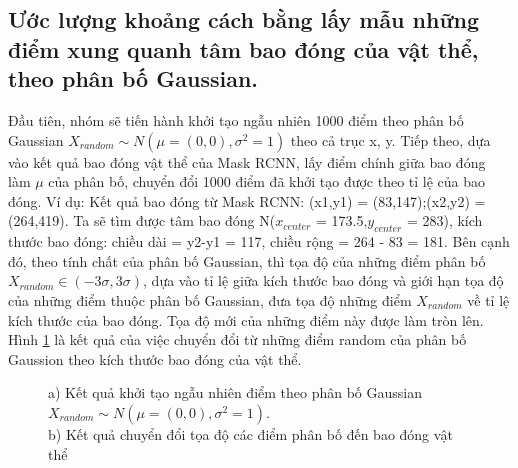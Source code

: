 \subsection{Ước lượng khoảng cách bằng lấy mẫu những điểm  xung quanh tâm bao đóng của vật thể, theo phân bố Gaussian.}

Đầu tiên, nhóm sẽ tiến hành khởi tạo ngẫu nhiên  1000 điểm theo phân bố Gaussian $ X_{random} \sim  N( \mu = (0,0),\sigma ^{2} = 1 )$ theo cả trục x, y. Tiếp theo, dựa vào kết quả bao đóng vật thể của Mask RCNN, lấy điểm chính giữa bao đóng làm $\mu$ của phân bố, chuyển đổi 1000 điểm đã khởi tạo được theo tỉ lệ của bao đóng. Ví dụ: Kết quả bao đóng từ Mask RCNN: (x1,y1) = (83,147);(x2,y2) = (264,419). Ta sẽ tìm được tâm bao đóng N($x_{center}$ = 173.5,$y_{center}$ = 283), kích thước bao đóng: chiều dài = y2-y1 = 117, chiều rộng =  264 - 83 = 181. Bên cạnh đó, theo tính chất của phân bố Gaussian, thì tọa độ của  những điểm phân bố $X_{random} \in (-3\sigma, 3\sigma)$, dựa vào tỉ lệ giữa kích thước bao đóng và giới hạn tọa độ của những điểm thuộc phân bố Gaussian, đưa tọa độ những điểm $X_{random}$ về tỉ lệ kích thước của bao đóng. Tọa độ mới của những điểm này được làm tròn lên. Hình \ref{fig:gaussian_to_bbbox} là kết quả của việc chuyển đổi từ những điểm random của phân bố Gaussion theo kích thước bao đóng của vật thể. 

\begin{figure}[H]%
    \centering
    \qquad
    \caption{ \small a) Kết quả khởi tạo ngẫu nhiên  điểm theo phân bố Gaussian $ X_{random} \sim  N( \mu = (0,0),\sigma ^{2} = 1 )$.\\ b) Kết quả chuyển đổi tọa độ các điểm phân bố đến bao đóng vật thể 
    }
    \label{fig:gaussian_to_bbbox}%
\end{figure}

